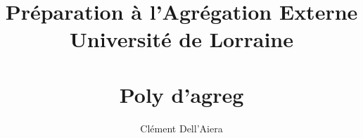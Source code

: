 \documentclass[a4paper]{article}
\title{Préparation à l'Agrégation Externe  \\ Université de Lorraine \\ ~ \\
\textbf{Poly d'agreg}}
\date{} %
\author{ Clément Dell'Aiera }
\begin{document}
  
\maketitle
\tableofcontents
\newpage 



\newpage


\newpage


\newpage




\nocite{*}
\end{document}
